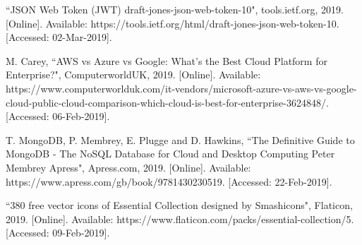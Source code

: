 \documentclass{article}
\begin{document}
\begin{thebibliography}{99}
 ``JSON Web Token (JWT) draft-jones-json-web-token-10", tools.ietf.org, 2019. [Online]. Available: https://tools.ietf.org/html/draft-jones-json-web-token-10. [Accessed: 02-Mar-2019].

 M. Carey, ``AWS vs Azure vs Google: What's the Best Cloud Platform for Enterprise?", ComputerworldUK, 2019. [Online]. Available: https://www.computerworlduk.com/it-vendors/microsoft-azure-vs-aws-vs-google-cloud-public-cloud-comparison-which-cloud-is-best-for-enterprise-3624848/. [Accessed: 06-Feb-2019].

 T. MongoDB, P. Membrey, E. Plugge and D. Hawkins, ``The Definitive Guide to MongoDB - The NoSQL Database for Cloud and Desktop Computing Peter Membrey Apress", Apress.com, 2019. [Online]. Available: https://www.apress.com/gb/book/9781430230519. [Accessed: 22-Feb-2019].

 ``380 free vector icons of Essential Collection designed by Smashicons", Flaticon, 2019. [Online]. Available: https://www.flaticon.com/packs/essential-collection/5. [Accessed: 09-Feb-2019].

\end{thebibliography} 
\end{document}
